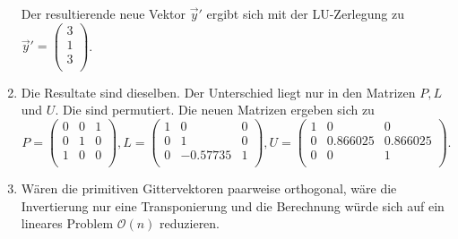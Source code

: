 \begin{enumerate}[label=\alph*)]
Der resultierende neue Vektor $\vec y'$ ergibt sich mit der LU-Zerlegung zu
$\vec y' = \begin{pmatrix}
    3\\
    1\\
    3\\
\end{pmatrix}$.
\item Die Resultate sind dieselben. Der Unterschied liegt nur in den Matrizen $P, L$ und $U$. Die sind permutiert. Die neuen Matrizen ergeben sich zu
\begin{equation*}
   P = \begin{pmatrix}
    0	&0	&1\\
    0	&1	&0\\
    1	&0	&0\\
    \end{pmatrix},
    L = \begin{pmatrix}
        1	&0	        &0 \\
        0	&1	        &0 \\
        0	&\num{-0.57735}   &1 \\
    \end{pmatrix},
    U = \begin{pmatrix}
        1	&0	        &0 \\
        0	&\num{0.866025}	&\num{0.866025} \\
        0	&0	        &1 \\
    \end{pmatrix}.
\end{equation*}

\item Wären die primitiven Gittervektoren paarweise orthogonal, wäre die Invertierung nur eine Transponierung und die Berechnung würde sich auf ein lineares Problem $\mathcal{O}(n)$ reduzieren.
\end{enumerate}

